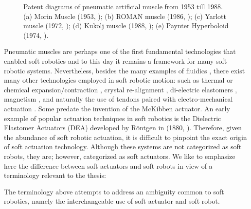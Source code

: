 \begin{figure}[!t]
  \vspace{-0.6mm}
  \centering
  
  \caption{Patent diagrams of pneumatic artificial muscle from 1953 till 1988. (a) Morin Muscle (1953, \cite{Morin1953}); (b) ROMAN muscle (1986, \cite{Immega1986}); (c) Yarlott muscle (1972, \cite{Yarlott1972}); (d) Kukolj muscle (1988, \cite{Kukolj1988}); (e) Paynter Hyperboloid (1974, \cite{Paynter1974}).
  \label{fig:C0:several_PAM}}
  \vspace{-5mm}
\end{figure}

Pneumatic muscles are perhaps one of the first fundamental technologies that enabled soft robotics and to this day it remains a framework for many soft robotic systems. Nevertheless, besides the many examples of fluidics \cite{Marchese2014,Marchese2016,Katzschmann2018,Suzumori1991,Mosadegh2014}, there exist many other technologies employed in soft robotic motion: such as thermal \cite{Wu2021Dec} or chemical expansion/contraction \cite{Tolley2014,Bartlett2015,Wehner2016}, crystal re-alignment \cite{Pilz2020,Lopez2018,Vantomme2021,Polygerinos2013}, di-electric elastomers \cite{Keplinger2011}, magnetism \cite{Roh2019Apr,KimYoonho2018,McDonald2020,Boyvat2017Jul}, and naturally the use of tendons paired with electro-mechanical actuation \cite{Renda2018,Bern2019,Kim2020Jun,Coevoet2017Feb,Wang2016Sep}. Some predate the invention of the McKibben actuator. An early example of popular actuation techniques in soft robotics is the Dielectric Elastomer Actuators (DEA) developed by R\"{o}ntgen in (1880, \cite{Rontgen1880}). Therefore, given the abundance of soft robotic actuation, it is difficult to pinpoint the exact origin of soft actuation technology. Although these systems are not categorized as soft robots, they are; however, categorized as soft actuators. We like to emphasize here the difference between soft actuators and soft robots in view of a terminology relevant to the thesis:

%
%
\begin{rmk} The terminology above attempts to address an ambiguity common to soft robotics, namely the interchangeable use of soft actuator and soft robot. 
\end{rmk}

